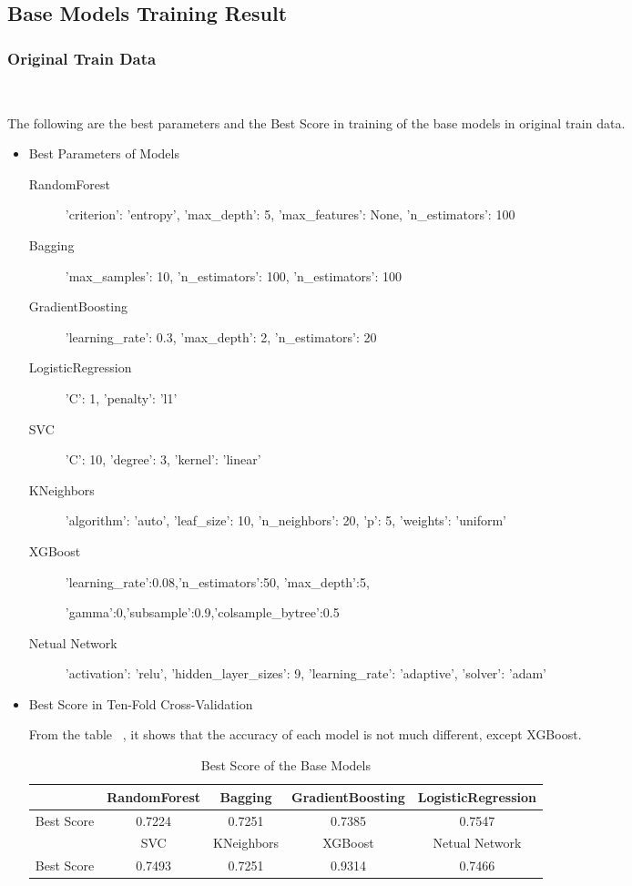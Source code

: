 \subsection{Base Models Training Result}
\subsubsection{Original Train Data}
\

The following are the best parameters and 
the Best Score in training of 
the base models 
in original train data. 

\begin{itemize}
	\item Best Parameters of Models
	\begin{description}
		\item[RandomForest] 'criterion': 'entropy', 'max_depth': 5, 
		'max_features': None, 'n_estimators': 100
		\item[Bagging] 'max_samples': 10, 'n_estimators': 100,
		'n_estimators': 100
		\item[GradientBoosting] 'learning_rate': 0.3, 'max_depth': 2, 
		'n_estimators': 20
		\item[LogisticRegression] 'C': 1, 'penalty': 'l1'
		\item[SVC] 'C': 10, 'degree': 3, 'kernel': 'linear'
		\item[KNeighbors] 'algorithm': 'auto', 'leaf_size': 10, 
		'n_neighbors': 20, 'p': 5, 'weights': 'uniform'
		\item[XGBoost] 'learning_rate':0.08,'n_estimators':50,
		'max_depth':5,
		
		'gamma':0,'subsample':0.9,'colsample_bytree':0.5
		\item[Netual Network] 'activation': 'relu', 'hidden_layer_sizes': 9, 
		'learning_rate': 'adaptive', 'solver': 'adam'
	\end{description}
	
	\item Best Score in Ten-Fold Cross-Validation
	
	From the table ~,
	it shows that the accuracy of 
	each model is not much different,
	except XGBoost.
	
	\begin{table}[h]  \centering
		\caption{Best Score of the Base Models}
		\label{tbl:best_score_base_models_old}
		\begin{tabular}{ccccc}
			\toprule
			& RandomForest & Bagging & GradientBoosting & 
			LogisticRegression \\
			\midrule
			Best Score & 0.7224 & 0.7251 & 0.7385 & 
			0.7547\\
			\bottomrule
			\toprule
			& SVC & KNeighbors & XGBoost & Netual Network\\
			\midrule
			Best Score & 0.7493 & 0.7251 & 0.9314 & 0.7466\\
			\bottomrule
		\end{tabular}
	\end{table}
\end{itemize}

